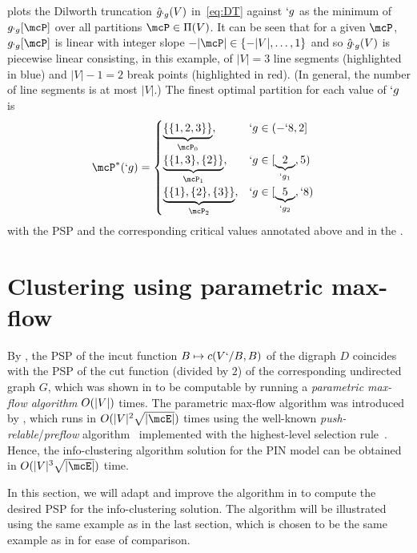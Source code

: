\documentclass[conference,letterpaper]{IEEEtran}
\begin{document}
 plots the Dilworth truncation $\hat{g}_{`g}(V)$ in~\eqref{eq:DT} against $`g$ as
the minimum of $g_{`g}[\mcP]$ over all partitions $\mcP \in \Pi(V)$. It can be seen that for a given
$\mcP$, 
$g_{`g}[\mcP]$ is linear with integer slope $-\abs{\mcP}\in \Set{-|V|,\dots,1}$ and so $\hat{g}_{`g}(V)$
is piecewise linear consisting, in this example, of  $|V|=3$ line segments (highlighted in blue) and $|V|-1=2$
break points (highlighted in red). (In general, the number of line segments is at most $|V|$.) The
finest optimal partition for each value of $`g$ is 
\begin{align}
\label{eq:eg:P*}
\mcP^*(`g) &= 
\begin{cases}
	\underbrace{\Set{\Set{1,2,3}}}_{\mcP_0}, & `g \in (-`8,2]\\
	\underbrace{\Set{\Set{1,3},\Set{2}}}_{\mcP_1}, &   `g \in [\underbrace{2}_{`g_1},5)\\
	\underbrace{\Set{\Set{1},\Set{2},\Set{3}}}_{\mcP_2}, &   `g \in [\underbrace{5}_{`g_2},`8)\\
\end{cases}
\end{align}
with the PSP and the corresponding critical values annotated above and in the .

\section{Clustering using parametric max-flow} 

By \cite[Proposition~9]{chan16cluster}, the PSP of the incut function $B\mapsto c(V`/B,B)$ of the
digraph $D$ coincides with the PSP of the cut function (divided by $2$) of the corresponding
undirected graph $G$, which was shown in \cite{kolmogorov10} to be computable by running a
\emph{parametric max-flow algorithm} $O(\lvert V\rvert)$ times. The parametric max-flow algorithm was
introduced by \cite{gallo89}, which runs in $O(\abs{V}^2 \sqrt{\abs{\mcE}})$ times using the
well-known \emph{push-relable}/\emph{preflow} algorithm~\cite{goldberg87-thesis,goldberg88-maxflow}
implemented with the highest-level selection rule~\cite{cherkassky97-push-relable}. Hence, the
info-clustering algorithm solution for the PIN model can be obtained in
$O(\abs{V}^3\sqrt{\abs{\mcE}})$ time. 

In this section, we will adapt and improve the algorithm in \cite{kolmogorov10} to compute the
desired PSP for the info-clustering solution. The algorithm will be illustrated using the same
example as in the last section, which is chosen to be the same example as in \cite{kolmogorov10} for
ease of comparison. 
\end{document}
